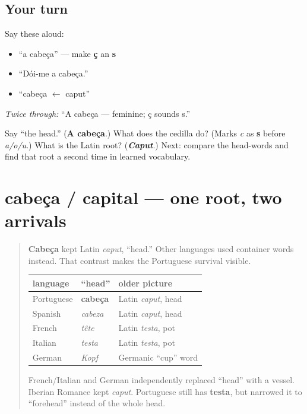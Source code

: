\subsection*{Your turn}
Say these aloud:

\begin{itemize}
\raggedright
  \item “a cabeça” — make \textbf{ç} an \textbf{s}
  \item “Dói-me a cabeça.”
  \item “cabeça $\leftarrow$ caput”
\end{itemize}

\emph{Twice through:} “A cabeça — feminine; ç sounds s.”

\begin{tcolorbox}[breakable,colback=teal!4,colframe=teal!35!black,title={Before you move on}]
Say “the head.” (\textbf{A cabeça}.) What does the cedilla do? (Marks \emph{c} as \textbf{s} before \emph{a/o/u}.) What is the Latin root? (\emph{\textbf{Caput}}.) Next: compare the head-words and find that root a second time in learned vocabulary.
\end{tcolorbox}
\section[cabeça / capital]{cabeça / capital — one root, two arrivals}

\label{lesson:PT-C17-cabeca-caput}



\begin{quote}
\textbf{Cabeça} kept Latin \emph{caput}, “head.” Other languages used container words instead. That contrast makes the Portuguese survival visible.

\noindent
\begin{tabularx}{\linewidth}{@{}>{\raggedright\arraybackslash}X>{\raggedright\arraybackslash}X>{\raggedright\arraybackslash}X@{}}
\toprule
\textbf{language} & \textbf{“head”} & \textbf{older picture} \\
\midrule
Portuguese & \textbf{cabeça} & Latin \emph{caput}, head \\
Spanish & \emph{cabeza} & Latin \emph{caput}, head \\
French & \emph{tête} & Latin \emph{testa}, pot \\
Italian & \emph{testa} & Latin \emph{testa}, pot \\
German & \emph{Kopf} & Germanic “cup” word \\
\bottomrule
\end{tabularx}

French/Italian and German independently replaced “head” with a vessel. Iberian Romance kept \emph{caput}. Portuguese still has \textbf{testa}, but narrowed it to “forehead” instead of the whole head.
\end{quote}

